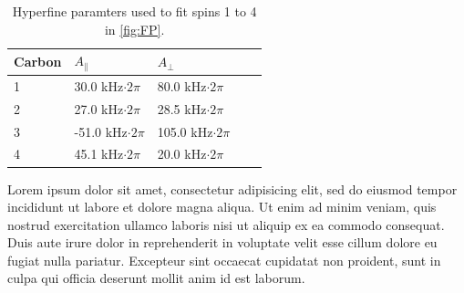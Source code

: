 \begin{table}[htbp]
    \begin{tabular}{lllll}
    Carbon &  $A_{\parallel} $ & $A_{\perp}$ \\ \hline
    1         & 30.0 kHz$\cdot 2 \pi$             & 80.0 kHz$\cdot 2 \pi$                \\
    2         & 27.0 kHz$\cdot 2 \pi$             & 28.5 kHz$\cdot 2 \pi$              \\
    3         & -51.0 kHz$\cdot 2 \pi$          & 105.0 kHz$\cdot 2 \pi$              \\
    4         & 45.1 kHz$\cdot 2 \pi$           & 20.0 kHz$\cdot 2 \pi$                \\
    \end{tabular}
    \caption{Hyperfine paramters used to fit spins 1 to 4 in \autoref{fig:FP}.}
    \label{tbl:HF_par}
\end{table}

Lorem ipsum dolor sit amet, consectetur adipisicing elit, sed do eiusmod
tempor incididunt ut labore et dolore magna aliqua. Ut enim ad minim veniam,
quis nostrud exercitation ullamco laboris nisi ut aliquip ex ea commodo
consequat. Duis aute irure dolor in reprehenderit in voluptate velit esse
cillum dolore eu fugiat nulla pariatur. Excepteur sint occaecat cupidatat non
proident, sunt in culpa qui officia deserunt mollit anim id est laborum.


